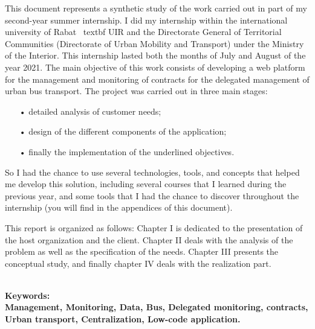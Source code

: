 This document represents a synthetic study of the work carried out in part of my second-year summer internship. I did my internship within
the international university of Rabat \ textbf {UIR} and the Directorate General of Territorial Communities (Directorate of Urban Mobility and Transport) under the Ministry of the Interior. This internship lasted both
the months of July and August of the year 2021. The main objective of this work
consists of developing a web platform for the management and monitoring of
contracts for the delegated management of urban bus transport. The project was carried out in three main stages:
\begin{itemize}
    \item[•] detailed analysis of customer needs;
    \item[•] design of the different components of the application;
    \item[•] finally the implementation of the underlined objectives.
\end{itemize}
So I had the chance to use several technologies, tools, and concepts that helped me develop this solution, including several courses that I learned during the previous year, and some tools that I had the chance to discover throughout the internship (you will find in the appendices of this document).

This report is organized as follows: Chapter I is dedicated to
the presentation of
the host organization and the client. Chapter II deals with
the analysis of the problem as well as the specification of the needs.
Chapter III presents the conceptual study, and finally chapter IV deals with the
realization part.

\textbf{\\Keywords:\\Management, Monitoring, Data, Bus, Delegated monitoring, contracts, Urban transport, Centralization, Low-code application.}
